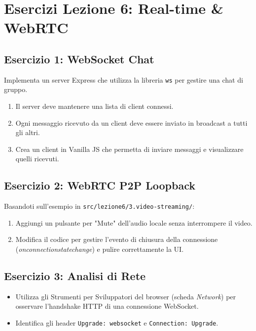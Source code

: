 \documentclass[11pt,a4paper]{report}
\begin{document}
\chapter*{Esercizi Lezione 6: Real-time & WebRTC}

\section*{Esercizio 1: WebSocket Chat}
Implementa un server Express che utilizza la libreria \texttt{ws} per gestire una chat di gruppo.
\begin{enumerate}
    \item Il server deve mantenere una lista di client connessi.
    \item Ogni messaggio ricevuto da un client deve essere inviato in broadcast a tutti gli altri.
    \item Crea un client in Vanilla JS che permetta di inviare messaggi e visualizzare quelli ricevuti.
\end{enumerate}

\section*{Esercizio 2: WebRTC P2P Loopback}
Basandoti sull'esempio in \texttt{src/lezione6/3.video-streaming/}:
\begin{enumerate}
    \item Aggiungi un pulsante per "Mute" dell'audio locale senza interrompere il video.
    \item Modifica il codice per gestire l'evento di chiusura della connessione (\textit{onconnectionstatechange}) e pulire correttamente la UI.
\end{enumerate}

\section*{Esercizio 3: Analisi di Rete}
\begin{itemize}
    \item Utilizza gli Strumenti per Sviluppatori del browser (scheda \textit{Network}) per osservare l'handshake HTTP di una connessione WebSocket.
    \item Identifica gli header \texttt{Upgrade: websocket} e \texttt{Connection: Upgrade}.
\end{itemize}
\end{document}
